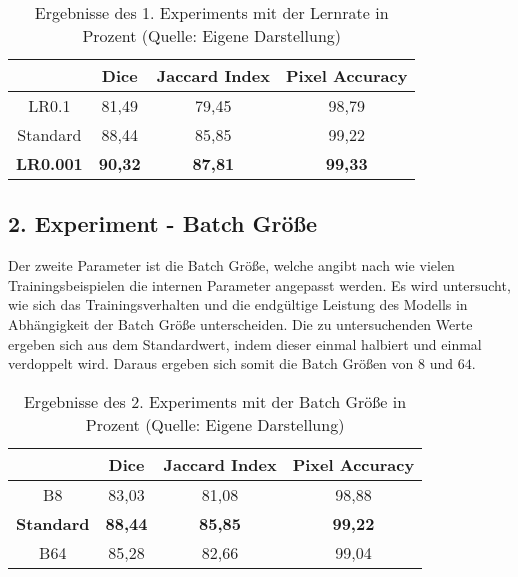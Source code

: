 \begin{table}[!h]
	\centering
	\begin{tabular}{|c|c|c|c|}
		\hline
		& Dice & Jaccard Index & Pixel Accuracy \\
		\hline
		LR0.1	& 81,49 			& 79,45 			& 98,79 \\
		\hline
		Standard& 88,44 			& 85,85 			& 99,22  \\
		\hline
		\textbf{LR0.001}	& \textbf{90,32} 	&  \textbf{87,81}	& \textbf{99,33} \\
		\hline
	\end{tabular}
	\caption{Ergebnisse des 1. Experiments mit der Lernrate in Prozent (Quelle: Eigene Darstellung)}
		\label{table:1.ExperimentErgebnisse}
\end{table}

\subsection{2. Experiment - Batch Größe}
Der zweite Parameter ist die Batch Größe, welche angibt nach wie vielen Trainingsbeispielen die internen Parameter angepasst werden. Es wird untersucht, wie sich das Trainingsverhalten und die endgültige Leistung des \gls{Modell}s in Abhängigkeit der Batch Größe unterscheiden. Die zu untersuchenden Werte ergeben sich aus dem Standardwert, indem dieser einmal halbiert und einmal verdoppelt wird. Daraus ergeben sich somit die Batch Größen von $8$ und $64$.

\begin{table}[!h]
	\centering
	\begin{tabular}{|c|c|c|c|}
		\hline
		& Dice & Jaccard Index & Pixel Accuracy \\
		\hline
		B8					& 83,03 			&81,08  			& 98,88 \\
		\hline
		\textbf{Standard}	& \textbf{88,44} 	& \textbf{85,85}  	& \textbf{99,22}  \\
		\hline
		B64					& 85,28  			& 82,66 			& 99,04 \\
		\hline
	\end{tabular}
	\caption{Ergebnisse des 2. Experiments mit der Batch Größe in Prozent (Quelle: Eigene Darstellung)}
	\label{table:2.ExperimentErgebnisse}
\end{table}

